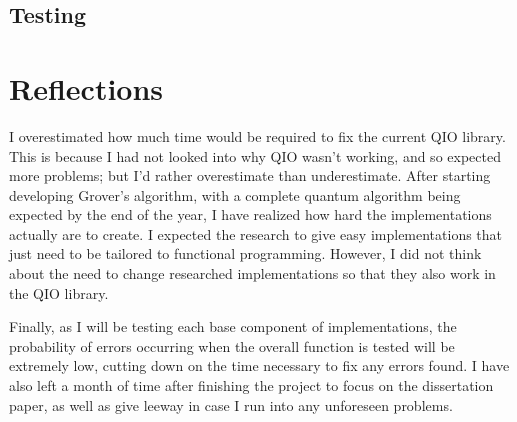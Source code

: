 \documentclass[a4paper,11pt, titlepage, twoside]{article}
\begin{document}
\subsection{Testing}


\section{Reflections}
I overestimated how much time would be required to fix the current QIO library. This is because I had not looked into why QIO wasn't working, and so expected more problems; but I'd rather overestimate than underestimate. After starting developing Grover's algorithm, with a complete quantum algorithm being expected by the end of the year, I have realized how hard the implementations actually are to create. I expected the research to give easy implementations that just need to be tailored to functional programming. However, I did not think about the need to change researched implementations so that they also work in the QIO library. \par
Finally, as I will be testing each base component of implementations, the probability of errors occurring when the overall function is tested will be extremely low, cutting down on the time necessary to fix any errors found. I have also left a month of time after finishing the project to focus on the dissertation paper, as well as give leeway in case I run into any unforeseen problems.

\newpage


\end{document}
